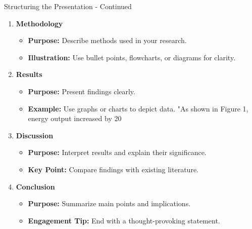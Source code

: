 \documentclass[aspectratio=169]{beamer}
\begin{document}
\begin{frame}[fragile]{Structuring the Presentation - Continued}
    \begin{enumerate}[resume]
        \item \textbf{Methodology}
        \begin{itemize}
            \item \textbf{Purpose:} Describe methods used in your research.
            \item \textbf{Illustration:} Use bullet points, flowcharts, or diagrams for clarity.
        \end{itemize}
        
        \item \textbf{Results}
        \begin{itemize}
            \item \textbf{Purpose:} Present findings clearly.
            \item \textbf{Example:} Use graphs or charts to depict data. "As shown in Figure 1, energy output increased by 20%
        \end{itemize}
        
        \item \textbf{Discussion}
        \begin{itemize}
            \item \textbf{Purpose:} Interpret results and explain their significance.
            \item \textbf{Key Point:} Compare findings with existing literature.
        \end{itemize}
        
        \item \textbf{Conclusion}
        \begin{itemize}
            \item \textbf{Purpose:} Summarize main points and implications.
            \item \textbf{Engagement Tip:} End with a thought-provoking statement.
        \end{itemize}
    \end{enumerate}
\end{frame}
\end{document}
